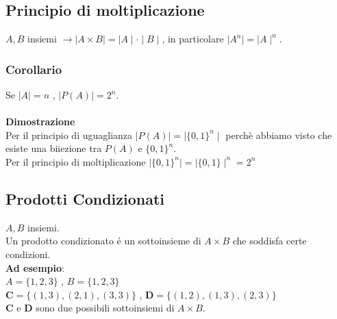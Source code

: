 \documentclass[11pt]{article}
\begin{document}
            \subsection{Principio di moltiplicazione}
            $A,B$ insiemi $\rightarrow \mid A \times B \mid = \mid A \mid \cdot \mid B \mid$, in particolare $\mid A^n \mid = \mid A \mid ^n$.
            \subsubsection{Corollario}
            Se $\mid A \mid = n$ , $\mid P(A)\mid=2^n$.\\
            \\
            \textbf{Dimostrazione}\\
            Per il principio di uguaglianza $\mid P(A) \mid = \mid \{0,1\}^n \mid$ perch\`e abbiamo visto che esiste una biiezione tra $P(A)$ e $\{0,1\}^n$.\\
            Per il principio di moltiplicazione $\mid\{0,1\}^n \mid=\mid \{0,1\}\mid^n= 2^n$
            \subsection{Prodotti Condizionati}
            $A,B$ insiemi.  \\
            Un prodotto condizionato \'e un sottoinsieme di $A\times B$ che soddisfa certe condizioni.\\ \textbf{Ad esempio}:\\
            $A=\{1,2,3\}$ , $B=\{1,2,3\}$ \\
            $\textbf{C}=\{(1,3),(2,1),(3,3)\}$ , $\textbf{D}=\{(1,2),(1,3),(2,3)\}$\\
            \textbf{C} e \textbf{D} sono due possibili sottoinsiemi di $A\times B$.
\end{document}
